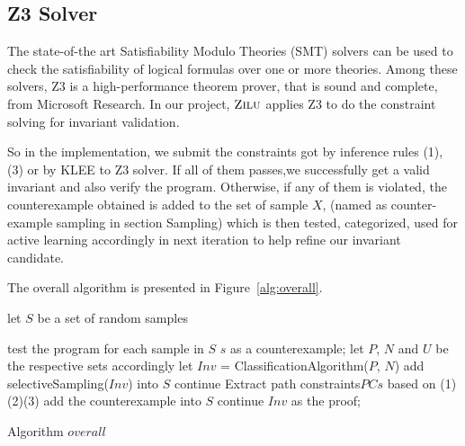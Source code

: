 \subsection{Z3 Solver}
The state-of-the art Satisfiability Modulo Theories (SMT) solvers can be used to check the satisfiability of logical formulas over one or more theories. 
Among these solvers, Z3 is a high-performance theorem prover, that is sound and complete, from Microsoft Research.
In our project, $\textsc{Zilu}$ applies Z3 to do the constraint solving for invariant validation. 

So in the implementation, we submit the constraints got by inference rules (1), (3) or by KLEE to Z3 solver.
If all of them passes,we successfully get a valid invariant and also verify the program. 
Otherwise, if any of them is violated, the counterexample obtained is added to the set of sample $X$, 
(named as counter-example sampling in section Sampling)
which is then tested, categorized, used for active learning accordingly in next iteration to help refine our invariant candidate.




 
The overall algorithm is presented in Figure~\ref{alg:overall}.
\begin{algorithm}[!h]
\SetAlgoVlined
\Indm
{}
\Indp
let $S$ be a set of random samples\;
 {
    test the program for each sample in $S$\;
     {
        \Return $s$ as a counterexample;
    }
    let $P$, $N$ and $U$ be the respective sets accordingly\;
    let $Inv$ = ClassificationAlgorithm($P$, $N$)\;
     {
        add selectiveSampling($Inv$) into $S$\;
        continue\;
    }
    Extract path constraints$PCs$ based on (1)(2)(3)\;
     {
         {
            add the counterexample into $S$\;
            continue\;
        }
    }
    \Return $Inv$ as the proof;
    
}
\caption{Algorithm $overall$}
\label{alg:overall}
\end{algorithm}



